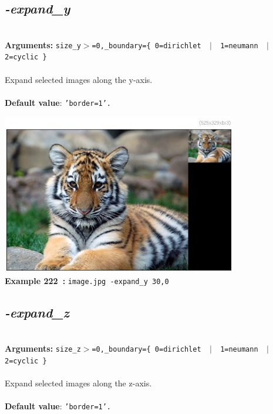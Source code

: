\documentclass[a4paper,11pt,twoside]{book}
\begin{document}
\subsection{\emph{-expand\_y} }\vspace*{-0.5em}
~\\\textbf{Arguments: } 
{\small \texttt{size\_y$>$=0,\_boundary=\{ 0=dirichlet ~$|$~ 1=neumann ~$|$~ 2=cyclic \}}}\\~\\
Expand selected images along the y-axis.
~\\~\\\textbf{Default value}: {\small \texttt{'border=1'.}}
\begin{center}\includegraphics[keepaspectratio=true,height=7cm,width=\textwidth]{img/gmic_def222.jpg}\\
{\footnotesize \textbf{Example 222~:} \texttt{image.jpg -expand\_y 30,0}}
\end{center}

\subsection{\emph{-expand\_z} }\vspace*{-0.5em}
~\\\textbf{Arguments: } 
{\small \texttt{size\_z$>$=0,\_boundary=\{ 0=dirichlet ~$|$~ 1=neumann ~$|$~ 2=cyclic \}}}\\~\\
Expand selected images along the z-axis.
~\\~\\\textbf{Default value}: {\small \texttt{'border=1'.}}
\end{document}

